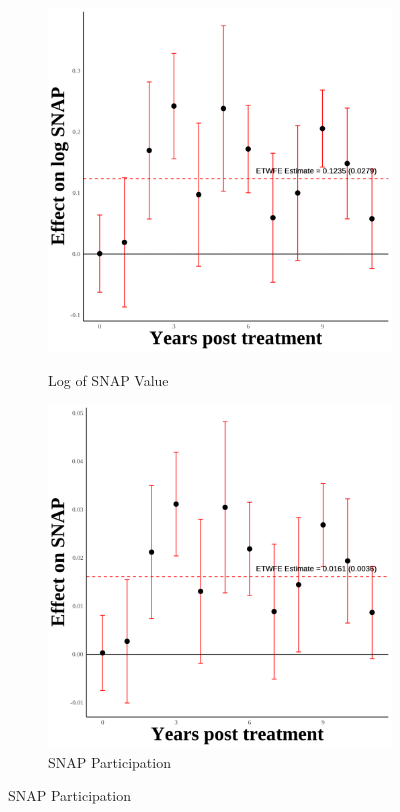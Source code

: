 \documentclass[12pt,english]{article}
\begin{document}
\begin{figure}[H]
  \vspace{0.3cm} %

  \begin{subfigure}[b]{0.3\textwidth}
    \centering
    \caption{Log of SNAP Value}
    \includegraphics[width=\linewidth]{figures/plot12-ln_snap_event_study-first.png}
    \label{fig:ln-snap-first}
  \end{subfigure}
  \hfill
  \begin{subfigure}[b]{0.3\textwidth}
    \centering
    \caption{SNAP Participation}
    \includegraphics[width=\linewidth]{figures/plot13-snap_event_study-first.png}

\end{subfigure}
\end{figure}
\end{document}
